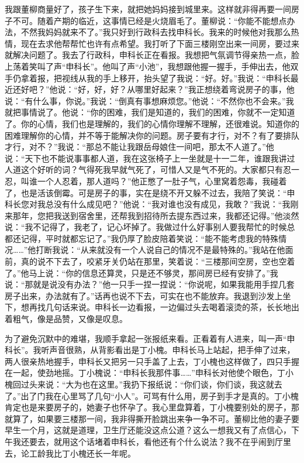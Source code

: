 \documentclass[12pt,oneside]{book}
\begin{document}
我跟董柳商量好了，孩子生下来，就把她妈妈接到城里来。这样就非得再要一间房子不可。随着产期的临近，这事情已经是火烧眉毛了。董柳说：``你能不能想点办法，不然我妈妈就来不了。''我只好到行政科去找申科长。我来的时候他对我那么热情，现在去求他帮帮忙也许有点希望。我打听了下面三楼刚空出来一间房，要过来就解决问题了。我去了行政科，申科长正在看报。我想把气氛调节得亲热一点，脸上荡着笑叫了声``申科长''。他叫了声``小池''，我想跟他握一握手，手伸出去，他双手仍拿着报，把视线从我的手上移开，抬头望了我说：``好。好。''我说：``申科长最近还好吧？''他说：``好，好，好？从哪里好起来？''我正想绕着弯说房子的事，他说：``有什么事，你说。''我说：``倒真有事想麻烦您。''他说：``不然你也不会来。''我就把事情说了。他说：``你的困难，我们是知道的，我们的困难，你就不一定知道了。你的心情，我们也是理解的，我们的心情你理解不理解，还很难说。知道你的困难理解你的心情，并不等于能解决你的问题。房子要有才行，对不？有了要排队才行，对不？''我说：``那总不能让我跟岳母娘住一间吧，那太不人道了。''他说：``天下也不能说事事都人道，我在这张椅子上一坐就是十一二年，谁跟我讲过人道这个好听的词？气得死我早就气死了，可惜人又是气不死的。大家都只有忍一忍，叫谁一个人忍着，那人道吗？''他正憋了一肚子气，心里窝着怨毒，我碰着了，也是活该倒霉。可是房子的事，实在是绕不开又躲不过去，我陪了笑说：``申科长您对我总没有什么成见吧？''他说：``我对谁也没有成见，我敢？''我说：``我刚来那年，您把我送到宿舍里，还帮我到招待所去提东西过来，我都还记得。''他淡然说：``我不记得了，我老了，记心坏掉了。我做过什么好事别人要我帮忙的时候总都还记得，平时就都忘记了。''我仍厚了脸皮陪着笑说：``能不能考虑我的特殊情况\ldots\ldots{}''他打断我说：``从来就没有一个人说自己的情况不是最特殊的。''我站在他面前，真的说不下去了，咬紧牙关仍站在那里，笑着说：``三楼那间空房，空也空着了。''他马上说：``你的信息还算灵，只是还不够灵，那间房已经有安排了。''我说：``那就是说没有办法？''他一只手一捏一捏说：``你说呢，如果我能用手捏几套房子出来，办法就有了。''话再也说不下去，可实在也不能放弃。我退到沙发上坐下，想再找几句话来说。申科长一边看报，一边偏过头去喝着滚烫的茶，长长地出着粗气，像是品赞，又像是叹息。

为了避免沉默中的难堪，我顺手拿起一张报纸来看。正看着有人进来，叫一声``申科长''。我听声音很熟，从背影看出是丁小槐。申科长马上站起，把手伸了过来，两人很亲热地握手，申科长又把另一只手盖了上去，丁小槐也这样做了，四只手握在一起，使劲地摇。丁小槐说：``申科长我那件事\ldots\ldots{}''申科长对他使个眼色，丁小槐回过头来说：``大为也在这里。''我扔下报纸说：``你们谈，你们谈，我这就去了。''出了门我在心里骂了几句``小人''。可骂有什么用，房子到手才是真的。丁小槐肯定也是来要房子的，她妻子也怀孕了。我心里盘算着，丁小槐要别处的房子，那就算了，如果要三楼那一间，我非得撕开脸跳出来争一争不可。董柳比他的妻子要早生一个月，这就是道理，卫生厅还能没这点公道？这么一想我又有了点信心，下午我还要去，就用这个话堵着申科长，看他还有个什么说法？我不在乎闹到厅里去，论工龄我比丁小槐还长一年呢。
\end{document}

